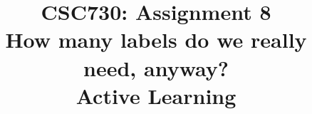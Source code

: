 \documentclass[conference]{IEEEtran}
\begin{document}
\title{CSC730: Assignment 8\\How many labels do we really need, anyway?\\Active Learning}

\maketitle




\printbibliography{}

\vspace{12pt}
\end{document}
